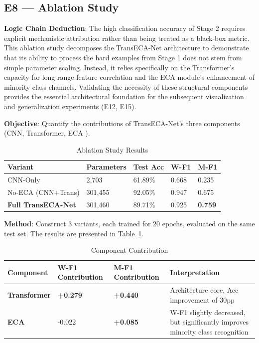 \documentclass[sigconf]{acmart}
\begin{document}
\subsection{E8 --- Ablation Study}
\textbf{Logic Chain Deduction}: The high classification accuracy of Stage 2 requires explicit mechanistic attribution rather than being treated as a black-box metric. This ablation study decomposes the TransECA-Net architecture to demonstrate that its ability to process the hard examples from Stage 1 does not stem from simple parameter scaling. Instead, it relies specifically on the Transformer's capacity for long-range feature correlation and the ECA module's enhancement of minority-class channels. Validating the necessity of these structural components provides the essential architectural foundation for the subsequent visualization and generalization experiments (E12, E15).

\textbf{Objective}: Quantify the contributions of TransECA-Net's three components (CNN, Transformer, ECA \cite{23}).


\begin{table}[!t]
\caption{Ablation Study Results}
\label{tab:ablation}
\begin{tabular}{lllll}
\toprule
\textbf{Variant} & \textbf{Parameters} & \textbf{Test Acc} & \textbf{W-F1} & \textbf{M-F1} \\
\midrule
CNN-Only & 2,703 & 61.89\% & 0.668 & 0.235 \\
No-ECA (CNN+Trans) & 301,455 & 92.05\% & 0.947 & 0.675 \\
\textbf{Full TransECA-Net} & 301,460 & 89.71\% & 0.925 & \textbf{0.759} \\
\bottomrule
\end{tabular}
\end{table}

\textbf{Method}: Construct 3 variants, each trained for 20 epochs, evaluated on the same test set. The results are presented in Table~\ref{tab:ablation}.


\begin{table}[!t]
\caption{Component Contribution}
\label{tab:contribution}
\begin{tabular}{p{2.8cm}p{3.0cm}p{3.0cm}p{7.6cm}}
\toprule
\textbf{Component} & \textbf{W-F1 Contribution} & \textbf{M-F1 Contribution} & \textbf{Interpretation} \\
\midrule
\textbf{Transformer} & \textbf{+0.279} & \textbf{+0.440} & Architecture core, Acc improvement of 30pp \\
\textbf{ECA} & -0.022 & \textbf{+0.085} & W-F1 slightly decreased, but significantly improves minority class recognition \\
\bottomrule
\end{tabular}
\end{table}
\end{document}
